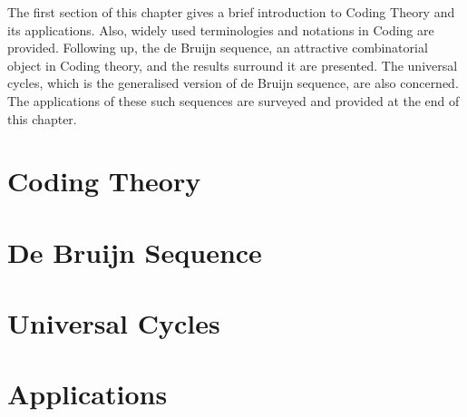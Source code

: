 The first section of this chapter gives a brief introduction to Coding Theory and its applications. Also, widely used terminologies and notations in Coding are provided. Following up, the de Bruijn sequence, an attractive combinatorial object in Coding theory, and the results surround it are presented. The universal cycles, which is the generalised version of de Bruijn sequence, are also concerned. The applications of these such sequences are surveyed and provided at the end of this chapter.

\section{Coding Theory}


\section{De Bruijn Sequence}


\section{Universal Cycles}\label{sec:universal_cycles}


\section{Applications }








